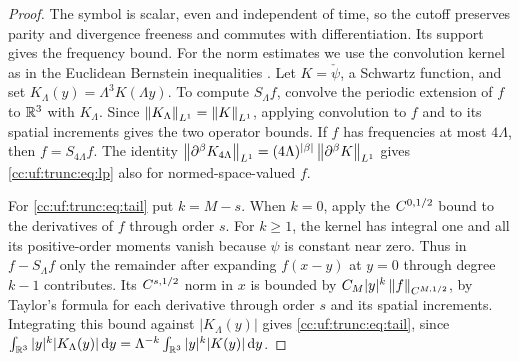 \begin{proof}
The symbol is scalar, even and independent of time, so the cutoff
preserves parity and divergence freeness and commutes with differentiation.
Its support gives the frequency bound. For the norm estimates we use
the convolution kernel as in the Euclidean Bernstein inequalities
\cite[Appendix~A, (A.2)--(A.6)]{TaoDispersive}. Let $K=\check\psi$,
a Schwartz function, and set $K_\Lambda(y)=\Lambda^3K(\Lambda y)$.
To compute $S_\Lambda f$,
convolve the periodic extension of $f$ to $\mathbb R^3$ with $K_\Lambda$.
Since $\left\lVert K_\Lambda\right\rVert_{L^1}=\left\lVert K\right\rVert_{L^1}$, applying convolution
to $f$ and to its spatial increments gives the two operator bounds.
If $f$ has frequencies at most $4\Lambda$, then $f=S_{4\Lambda}f$.
The identity $\left\lVert\partial^\beta K_{4\Lambda}\right\rVert_{L^1}
=(4\Lambda)^{|\beta|}\left\lVert\partial^\beta K\right\rVert_{L^1}$ gives
\eqref{cc:uf:trunc:eq:lp} also for normed-space-valued $f$.

For \eqref{cc:uf:trunc:eq:tail} put $k=M-s$. When $k=0$, apply the
$C^{0,1/2}$ bound to the derivatives of $f$ through order $s$.
For $k\ge1$, the kernel has integral one and all its positive-order
moments vanish because $\psi$ is constant near zero. Thus in
$f-S_\Lambda f$ only the remainder after expanding $f(x-y)$ at $y=0$
through degree $k-1$ contributes. Its $C^{s,1/2}$ norm in $x$ is bounded
by $C_M|y|^k\left\lVert f\right\rVert_{C^{M,1/2}}$, by Taylor's formula for each derivative
through order $s$ and its spatial increments. Integrating this bound
against $|K_\Lambda(y)|$ gives \eqref{cc:uf:trunc:eq:tail}, since
$\int_{\mathbb R^3}|y|^k|K_\Lambda(y)|\,\mathrm d y
=\Lambda^{-k}\int_{\mathbb R^3}|y|^k|K(y)|\,\mathrm d y$.
\end{proof}
